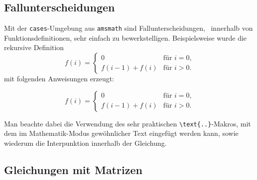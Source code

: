\subsection{Fallunterscheidungen}

Mit der \texttt{cases}-Umgebung aus \texttt{amsmath} sind Fallunterscheidungen,
\ua\ innerhalb von Funktionsdefinitionen, sehr einfach zu bewerkstelligen.
Beispielsweise wurde die rekursive Definition
%
\begin{equation}
	f(i) =
	\begin{cases}
		0             & \text{für $i = 0$,}\\
		f(i-1) + f(i) & \text{für $i > 0$.}
	\end{cases}
\end{equation}%
%
mit folgenden Anweisungen erzeugt:
%
\begin{LaTeXCode}[numbers=none]
\begin{equation}
	f(i) =
	\begin{cases}
	  0             & \text{für $i = 0$,}\\
	  f(i-1) + f(i) & \text{für $i > 0$.}
	\end{cases}
\end{equation}
\end{LaTeXCode}
%
Man beachte dabei die Verwendung des sehr praktischen \verb!\text{..}!-Makros,
mit dem im Mathematik-Modus gewöhnlicher Text eingefügt werden kann, sowie
wiederum die Interpunktion innerhalb der Gleichung.


\subsection{Gleichungen mit Matrizen}


